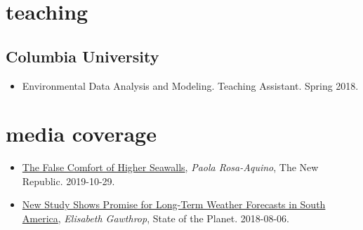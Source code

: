 \documentclass[11pt,article,oneside]{memoir}
\begin{document}

\section{teaching}

\mbox{}\vspace{-\dimexpr\baselineskip\relax}

\vspace{\baselineskip}



\subsection{Columbia University}
\begin{itemize}[label={}]

  \item Environmental Data Analysis and Modeling. Teaching Assistant. Spring 2018.

\end{itemize}


%
%
%
%
%
%  
%        
%


\section{media coverage}

\mbox{}\vspace{-\dimexpr\baselineskip\relax}

\begin{itemize}[label={}]

  \item \href{https://newrepublic.com/article/155519/false-comfort-higher-seawalls}{The False Comfort of Higher Seawalls}, \textit{Paola Rosa-Aquino}, The New Republic. 2019-10-29.

  \item \href{https://blogs.ei.columbia.edu/2018/08/06/subseasonal-weather-forecasts-paraguay/}{New Study Shows Promise for Long-Term Weather Forecasts in South America}, \textit{Elisabeth Gawthrop}, State of the Planet. 2018-08-06.

\end{itemize}
\end{document}
